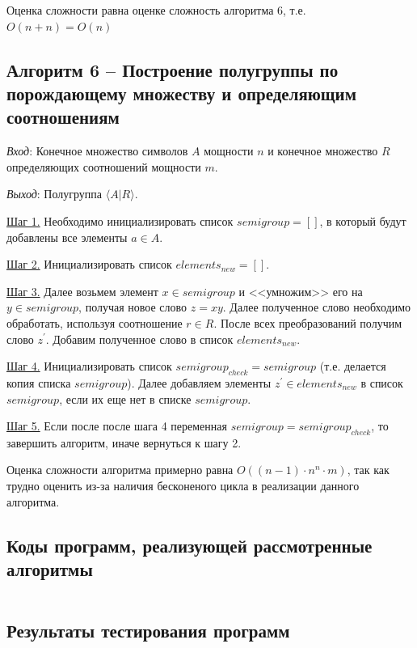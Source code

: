 \documentclass[spec, och, labwork]{shiza}
\begin{document}
        Оценка сложности равна оценке сложность алгоритма 6, т.е. $O(n + n) = O(n)$
  
        \subsection{Алгоритм 6 -- Построение полугруппы по порождающему множеству и определяющим соотношениям}
  
        \textit{Вход}: Конечное множество символов $A$ мощности $n$ и конечное множество $R$ определяющих соотношений мощности $m$.
  
        \textit{Выход}: Полугруппа $\langle A | R \rangle$.
  
        \underline{Шаг 1.} Необходимо инициализировать список $semigroup = []$, в который будут добавлены все элементы $a \in A$.
        
        \underline{Шаг 2.} Инициализировать список $elements_{new} = []$.
  
        \underline{Шаг 3.} Далее возьмем элемент $x \in semigroup$ и <<умножим>> его на $y \in semigroup$, получая новое слово
        $z = xy$. Далее полученное слово необходимо обработать, используя соотношение $r \in R$. После всех преобразований получим слово $z^{'}$.
        Добавим полученное слово в список $elements_{new}$.
  
        \underline{Шаг 4.} Инициализировать список $semigroup_{check} = semigroup$ (т.е. делается копия списка $semigroup$). Далее добавляем
        элементы $z^{'} \in elements_{new}$ в список $semigroup$, если их еще нет в списке $semigroup$. 
  
        \underline{Шаг 5.} Если после после шага 4 переменная $semigroup = semigroup_{check}$, то завершить алгоритм, иначе вернуться к шагу 2.
  
        Оценка сложности алгоритма примерно равна $O((n - 1) \cdot n^n \cdot m)$, так как трудно оценить из-за наличия бесконеного цикла в реализации
        данного алгоритма.

        \subsection{Коды программ, реализующей рассмотренные алгоритмы}

        \inputminted[fontsize=\small]{python}{../code/lab5.py}

      \newpage
      
      \subsection{Результаты тестирования программ}
      
\end{document}
